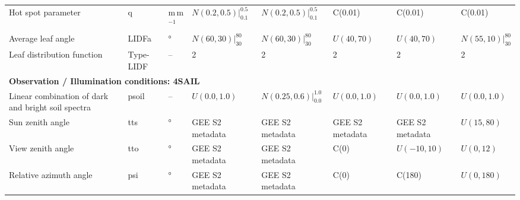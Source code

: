 \documentclass{article}
\begin{document}
\begin{landscape}
\begin{table}[htbp]
\begin{tabular}{p{2.2cm} l l l l l l l}
Hot spot parameter & q & m\,m$^{-1}$ & $N(0.2,0.5)|_{0.1}^{0.5}$ & $N(0.2,0.5)|_{0.1}^{0.5}$ & C(0.01) & C(0.01) & C(0.01) \\
Average leaf angle & LIDFa & ° & $N(60,30)|_{30}^{80}$ & $N(60,30)|_{30}^{80}$ & $U(40,70)$ & $U(40,70)$ & $N(55,10)|_{30}^{80}$ \\
Leaf distribution function & Type-LIDF & -- & 2 & 2 & 2 & 2 & 2 \\[3pt]
\midrule
\multicolumn{8}{l}{\textbf{Observation / Illumination conditions: 4SAIL}} \\[2pt]
\midrule
Linear combination of dark and bright soil spectra & psoil & -- & $U(0.0,1.0)$ & $N(0.25,0.6)|_{0.0}^{1.0}$ & $U(0.0,1.0)$ & $U(0.0,1.0)$ & $U(0.0,1.0)$ \\
Sun zenith angle & tts & ° & GEE S2 metadata & GEE S2 metadata & GEE S2 metadata & GEE S2 metadata & $U(15,80)$ \\
View zenith angle & tto & ° & GEE S2 metadata & GEE S2 metadata & C(0) & $U(-10,10)$ & $U(0,12)$ \\
Relative azimuth angle & psi & ° & GEE S2 metadata & GEE S2 metadata & C(0) & C(180) & $U(0,180)$ \\
\hline
\end{tabular}
\label{tab:prosail_parameters}
\end{table}


\end{landscape}
\end{document}
